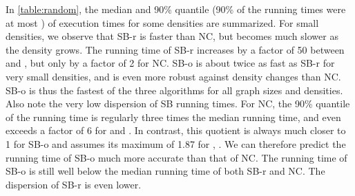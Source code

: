\documentclass[runningheads,a4paper]{llncs}
\begin{document}
In \autoref{table:random}, the median and 90\% quantile  (90\% of the running times were at most ) of execution times for some densities are summarized.
For small densities, we observe that SB-r is faster than NC, but becomes much slower as the density grows.
The running time of SB-r increases by a factor of 50 between  and , but only by a factor of 2 for NC.
SB-o is about twice as fast as SB-r for very small densities, and is even more robust against density changes than NC.
SB-o is thus the fastest of the three algorithms for all graph sizes and densities.
Also note the very low dispersion of SB running times.
For NC, the 90\% quantile of the running time is regularly three times the median running time, and even exceeds a factor of 6 for  and .
In contrast, this quotient is always much closer to 1 for SB-o and assumes its maximum of 1.87 for , .
We can therefore predict the running time of SB-o much more accurate than that of NC.
The  running time of SB-o is still well below the median running time of both SB-r and NC.
The dispersion of SB-r is even lower.
\end{document}
